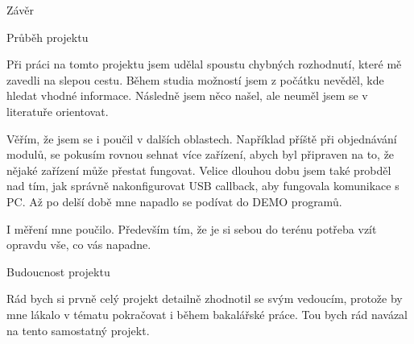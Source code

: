 
\def\ctustyle{{\ssr CTUstyle}}
\def\ttb{\tt\char`\\} %

\chap Závěr

\sec Průběh projektu

Při práci na tomto projektu jsem udělal spoustu chybných rozhodnutí, které mě zavedli na slepou cestu. Během studia možností jsem z počátku nevěděl, kde hledat vhodné informace. Následně jsem něco našel, ale neuměl jsem se v literatuře orientovat.

Věřím, že jsem se i poučil v dalších oblastech. Například příště při objednávání modulů, se pokusím rovnou sehnat více zařízení, abych byl připraven na to, že nějaké zařízení může přestat fungovat. Velice dlouhou dobu jsem také probděl nad tím, jak správně nakonfigurovat USB callback, aby fungovala komunikace s PC. Až po delší době mne napadlo se podívat do DEMO programů.

I měření mne poučilo. Především tím, že je si sebou do terénu potřeba vzít opravdu vše, co vás napadne.

\sec Budoucnost projektu

Rád bych si prvně celý projekt detailně zhodnotil se svým vedoucím, protože by mne lákalo v tématu pokračovat i během bakalářské práce. Tou bych rád navázal na tento samostatný projekt.
